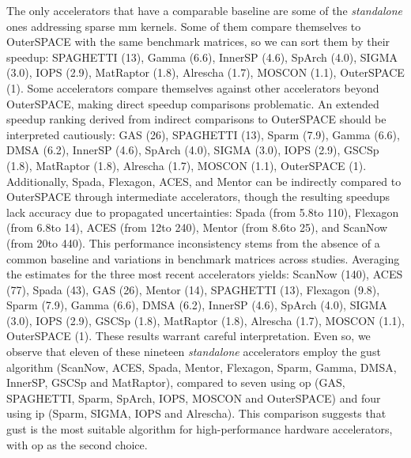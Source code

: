 The only accelerators that have a comparable baseline are some of the \textit{standalone} ones addressing sparse \acrshort{mm} kernels.
Some of them compare themselves to OuterSPACE with the same benchmark matrices, so we can sort them by their speedup: SPAGHETTI (13\tm), Gamma (6.6\tm), InnerSP (4.6\tm), SpArch (4.0\tm), SIGMA (3.0\tm), IOPS (2.9\tm), MatRaptor (1.8\tm), Alrescha (1.7\tm), MOSCON (1.1\tm), OuterSPACE (1\tm).
Some accelerators compare themselves against other accelerators beyond OuterSPACE, making direct speedup comparisons problematic.
An extended speedup ranking derived from indirect comparisons to OuterSPACE should be interpreted cautiously: GAS (26\tm), SPAGHETTI (13\tm), Sparm (7.9\tm), Gamma (6.6\tm), DMSA (6.2\tm), InnerSP (4.6\tm), SpArch (4.0\tm), SIGMA (3.0\tm), IOPS (2.9\tm), GSCSp (1.8\tm), MatRaptor (1.8\tm), Alrescha (1.7\tm), MOSCON (1.1\tm), OuterSPACE (1\tm).
Additionally, Spada, Flexagon, ACES, and Mentor can be indirectly compared to OuterSPACE through intermediate accelerators, though the resulting speedups lack accuracy due to propagated uncertainties: Spada (from 5.8\tms to 110\tm), Flexagon (from 6.8\tms to 14\tm), ACES (from 12\tms to 240\tm), Mentor (from 8.6\tms to 25\tm), and ScanNow (from 20\tms to 440\tm).
This performance inconsistency stems from the absence of a common baseline and variations in benchmark matrices across studies.
Averaging the estimates for the three most recent accelerators yields: ScanNow (140\tm), ACES (77\tm), Spada (43\tm), GAS (26\tm), Mentor (14\tm), SPAGHETTI (13\tm), Flexagon (9.8\tm), Sparm (7.9\tm), Gamma (6.6\tm), DMSA (6.2\tm), InnerSP (4.6\tm), SpArch (4.0\tm), SIGMA (3.0\tm), IOPS (2.9\tm), GSCSp (1.8\tm), MatRaptor (1.8\tm), Alrescha (1.7\tm), MOSCON (1.1\tm), OuterSPACE (1\tm).
These results warrant careful interpretation.
Even so, we observe that eleven of these nineteen \textit{standalone} accelerators employ the \acrshort{gust} algorithm (\eg ScanNow, ACES, Spada, Mentor, Flexagon, Sparm, Gamma, DMSA, InnerSP, GSCSp and MatRaptor), compared to seven using \acrshort{op} (\eg GAS, SPAGHETTI, Sparm, SpArch, IOPS, MOSCON and OuterSPACE) and four using \acrshort{ip} (\eg Sparm, SIGMA, IOPS and Alrescha).
This comparison suggests that \acrshort{gust} is the most suitable algorithm for high-performance hardware accelerators, with \acrshort{op} as the second choice.

